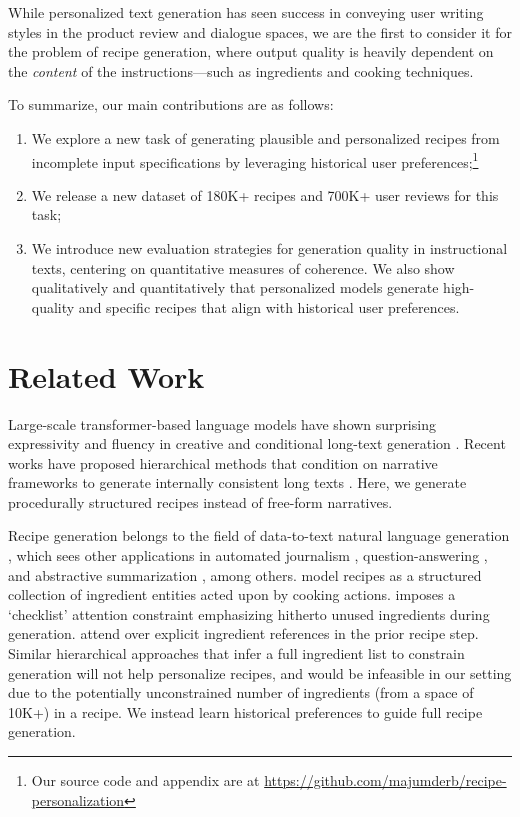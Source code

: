 \documentclass[11pt,a4paper]{article}
\begin{document}
While personalized text generation has seen success in conveying user writing styles in the product review \cite{DBLP:conf/ijcnlp/NiLVM17, DBLP:conf/acl/NiM18} and dialogue \cite{DBLP:conf/acl/KielaWZDUS18} spaces, we are the first to consider it for the problem of recipe generation, where
output quality is heavily dependent on the \textit{content} of the instructions---such as ingredients and cooking techniques.

To summarize, our main contributions are as follows:
\begin{enumerate}[itemsep=-1ex]
    \item We explore a new task of generating plausible and personalized recipes from incomplete input specifications by leveraging historical user preferences;\footnote{Our source code and appendix are at \url{https://github.com/majumderb/recipe-personalization}}
    \item We release a new dataset of 180K+ recipes and 700K+ user reviews for this task;
    \item We introduce new evaluation strategies for generation quality in instructional texts, centering on quantitative measures of coherence. We also show qualitatively and quantitatively that personalized models generate high-quality and specific recipes that align with historical user preferences.
\end{enumerate}

\section{Related Work}

Large-scale transformer-based language models have shown surprising expressivity and fluency in creative and conditional long-text generation \cite{DBLP:conf/nips/VaswaniSPUJGKP17, radford2019language}.
Recent works have proposed hierarchical methods that condition on narrative frameworks to generate internally consistent long texts \cite{DBLP:conf/acl/LewisDF18, DBLP:conf/emnlp/XuRZZC018, DBLP:journals/corr/abs-1811-05701}.
Here, we generate procedurally structured recipes instead of free-form narratives.

Recipe generation belongs to the field of data-to-text natural language generation \cite{DBLP:journals/jair/GattK18}, which sees other applications in automated journalism \cite{DBLP:conf/inlg/LeppanenMGT17}, question-answering \cite{Antol_2015_ICCV}, and abstractive summarization \cite{DBLP:conf/iclr/PaulusXS18}, among others.
\citet{DBLP:conf/emnlp/KiddonPZC15, DBLP:conf/iclr/BosselutLHEFC18} model recipes as a structured collection of ingredient entities acted upon by cooking actions.
\citet{kiddon2016globally} imposes a `checklist' attention constraint emphasizing hitherto unused ingredients during generation.
\citet{DBLP:conf/emnlp/YangBDL17} attend over explicit ingredient references in the prior recipe step.
Similar hierarchical approaches that infer a full ingredient list to constrain generation will not help personalize recipes, and would be infeasible in our setting due to the potentially unconstrained number of ingredients (from a space of 10K+) in a recipe.
We instead learn historical preferences to guide full recipe generation.
\end{document}
